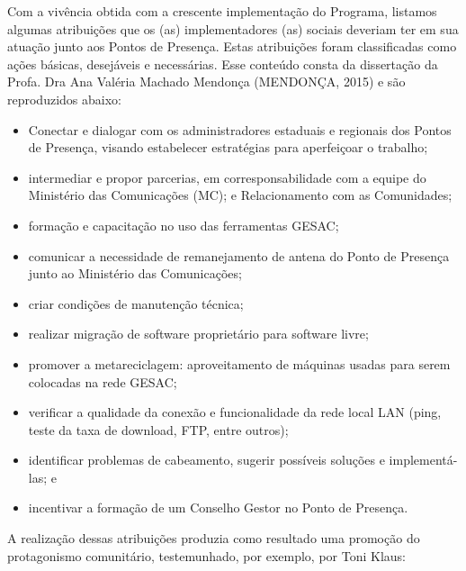 Com a vivência obtida com a crescente implementação do Programa, listamos  algumas atribuições que os (as) implementadores (as) sociais deveriam ter em sua atuação junto aos Pontos de Presença. Estas atribuições foram classificadas como ações básicas, desejáveis e necessárias. Esse conteúdo consta da dissertação da Profa. Dra Ana Valéria Machado Mendonça  (MENDONÇA, 2015) e são reproduzidos abaixo:


\begin{itemize}
\item Conectar e dialogar com os administradores estaduais e regionais dos Pontos de Presença, visando estabelecer estratégias para aperfeiçoar o trabalho;
\item intermediar e propor parcerias, em corresponsabilidade com a equipe do Ministério das Comunicações (MC); e Relacionamento com as Comunidades;
\item formação e capacitação no uso das ferramentas GESAC;
\item comunicar a  necessidade de remanejamento de antena  do Ponto de Presença junto ao Ministério das Comunicações;
\item criar condições de manutenção técnica;
\item realizar migração de software proprietário para software livre;
\item promover a metareciclagem: aproveitamento de máquinas usadas para serem colocadas na rede GESAC;
\item verificar a qualidade da conexão e  funcionalidade da rede local LAN (ping, teste da taxa de download, FTP, entre outros);
\item identificar problemas de cabeamento, sugerir possíveis soluções e implementá-las; e
\item incentivar a formação de um Conselho Gestor no Ponto de Presença.
\end{itemize}

A realização dessas atribuições produzia como resultado uma promoção do protagonismo comunitário, testemunhado, por exemplo, por Toni Klaus:


\noindent\begin{center}\mbox{\centering{}}\end{center}


